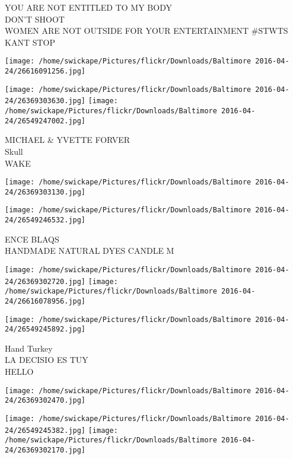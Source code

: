 \documentclass[10pt,letterpaper]{article}
\begin{document}
YOU ARE NOT ENTITLED TO MY BODY\\
DON'T SHOOT\\
WOMEN ARE NOT OUTSIDE FOR YOUR ENTERTAINMENT \#STWTS\\
KANT STOP\\
\pagebreak

\texttt{[image: /home/swickape/Pictures/flickr/Downloads/Baltimore 2016-04-24/26616091256.jpg]}

\vspace{0.25in}
\texttt{[image: /home/swickape/Pictures/flickr/Downloads/Baltimore 2016-04-24/26369303630.jpg]}
\texttt{[image: /home/swickape/Pictures/flickr/Downloads/Baltimore 2016-04-24/26549247002.jpg]}

MICHAEL \& YVETTE FORVER\\
Skull\\
WAKE\\
\pagebreak

\texttt{[image: /home/swickape/Pictures/flickr/Downloads/Baltimore 2016-04-24/26369303130.jpg]}

\vspace{0.25in}
\texttt{[image: /home/swickape/Pictures/flickr/Downloads/Baltimore 2016-04-24/26549246532.jpg]}

ENCE BLAQS\\
HANDMADE NATURAL DYES CANDLE M\\
\pagebreak

\texttt{[image: /home/swickape/Pictures/flickr/Downloads/Baltimore 2016-04-24/26369302720.jpg]}
\texttt{[image: /home/swickape/Pictures/flickr/Downloads/Baltimore 2016-04-24/26616078956.jpg]}

\texttt{[image: /home/swickape/Pictures/flickr/Downloads/Baltimore 2016-04-24/26549245892.jpg]}

Hand Turkey\\
LA DECISIO ES TUY\\
HELLO\\
\pagebreak

\texttt{[image: /home/swickape/Pictures/flickr/Downloads/Baltimore 2016-04-24/26369302470.jpg]}

\vspace{0.25in}
\texttt{[image: /home/swickape/Pictures/flickr/Downloads/Baltimore 2016-04-24/26549245382.jpg]}
\texttt{[image: /home/swickape/Pictures/flickr/Downloads/Baltimore 2016-04-24/26369302170.jpg]}
\end{document}

